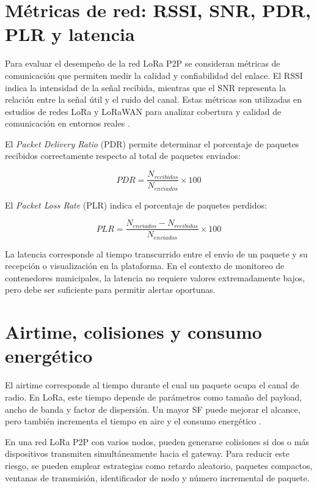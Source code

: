 \section{Métricas de red: RSSI, SNR, PDR, PLR y latencia}

Para evaluar el desempeño de la red LoRa P2P se consideran métricas de comunicación que permiten medir la calidad y confiabilidad del enlace. El RSSI indica la intensidad de la señal recibida, mientras que el SNR representa la relación entre la señal útil y el ruido del canal. Estas métricas son utilizadas en estudios de redes LoRa y LoRaWAN para analizar cobertura y calidad de comunicación en entornos reales \cite{cruz2021lorawanwaste,baldo2021multilayer}.

El \textit{Packet Delivery Ratio} (PDR) permite determinar el porcentaje de paquetes recibidos correctamente respecto al total de paquetes enviados:

\[
PDR = \frac{N_{recibidos}}{N_{enviados}} \times 100
\]

El \textit{Packet Loss Rate} (PLR) indica el porcentaje de paquetes perdidos:

\[
PLR = \frac{N_{enviados} - N_{recibidos}}{N_{enviados}} \times 100
\]

La latencia corresponde al tiempo transcurrido entre el envío de un paquete y su recepción o visualización en la plataforma. En el contexto de monitoreo de contenedores municipales, la latencia no requiere valores extremadamente bajos, pero debe ser suficiente para permitir alertas oportunas.

\section{Airtime, colisiones y consumo energético}

El airtime corresponde al tiempo durante el cual un paquete ocupa el canal de radio. En LoRa, este tiempo depende de parámetros como tamaño del payload, ancho de banda y factor de dispersión. Un mayor SF puede mejorar el alcance, pero también incrementa el tiempo en aire y el consumo energético \cite{ttn_spreading,ttn_modulation}.

En una red LoRa P2P con varios nodos, pueden generarse colisiones si dos o más dispositivos transmiten simultáneamente hacia el gateway. Para reducir este riesgo, se pueden emplear estrategias como retardo aleatorio, paquetes compactos, ventanas de transmisión, identificador de nodo y número incremental de paquete.

